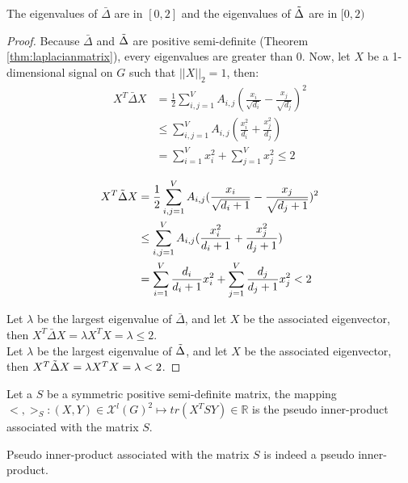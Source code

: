 \documentclass[12pt]{article}
\begin{document}
\begin{thm} \label{thm:laplacianeigenvalues}
    The eigenvalues of $\bar{\Delta}$ are in $[0,2]$ and the eigenvalues of $\Tilde{\Delta}$ are in $[0,2)$
\end{thm}

\begin{proof}
    Because $\bar{\Delta}$ and $\Tilde{\Delta}$ are positive semi-definite (Theorem \ref{thm:laplacianmatrix}), every eigenvalues are greater than $0$. Now, let $X$ be a 1-dimensional signal on $G$ such that $||X||_2 = 1$, then:
    \begin{align*}
        X^T \bar{\Delta} X  &= \frac{1}{2} \sum_{i,j = 1}^V A_{i,j} (\frac{x_i}{\sqrt{d_i}} -\frac{x_j}{\sqrt{d_j}})^2 \\
        &\leq  \sum_{i,j = 1}^V A_{i,j}(\frac{x_i^2}{d_i} + \frac{x_j^2}{d_j}) \\
        &= \sum_{i=1}^V x_i^2 + \sum_{j=1}^V x_j^2 \leq 2
    \end{align*}
    
    \begin{align*}
        X^T \Tilde{\Delta} X  &= \frac{1}{2} \sum_{i,j = 1}^V A_{i,j} (\frac{x_i}{\sqrt{d_i+1}} -\frac{x_j}{\sqrt{d_j+1}})^2 \\
        &\leq  \sum_{i,j = 1}^V A_{i,j}(\frac{x_i^2}{d_i+1} + \frac{x_j^2}{d_j+1}) \\
        &= \sum_{i=1}^V \frac{d_i}{d_i +1} x_i^2 + \sum_{j=1}^V \frac{d_j}{d_j+1} x_j^2 < 2
    \end{align*}

    Let $\lambda$ be the largest eigenvalue of $\bar{\Delta}$, and let $X$ be the associated eigenvector, then $X^T \bar{\Delta} X = \lambda X^T X = \lambda \leq 2$.\\

     Let $\lambda$ be the largest eigenvalue of $\Tilde{\Delta}$, and let $X$ be the associated eigenvector, then $X^T \Tilde{\Delta} X = \lambda X^T X = \lambda < 2$.
\end{proof}

\begin{definition}
    Let a $S$ be a symmetric positive semi-definite matrix, the mapping $<,>_{S}: (X,Y) \in \mathcal{X}^l(G)^2 \longmapsto tr(X^T S Y) \in \mathbb{R}$ is the  pseudo inner-product associated with the matrix $S$.
\end{definition}

\begin{thm}
    Pseudo inner-product associated with the matrix $S$ is indeed a pseudo inner-product.
\end{thm}
\end{document}
